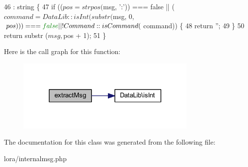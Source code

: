 \begin{DoxyCode}
46                                                     : \textcolor{keywordtype}{string} \{
47         \textcolor{keywordflow}{if} (($pos = strpos ($msg, \textcolor{charliteral}{':'})) === \textcolor{keyword}{false} || ($command = DataLib::isInt (substr ($msg, 0, $pos))) 
      === \textcolor{keyword}{false} || !Command::isCommand ($command)) \{
48             \textcolor{keywordflow}{return} \textcolor{stringliteral}{''};
49         \}
50         \textcolor{keywordflow}{return} substr ($msg, $pos + 1);
51     \}
\end{DoxyCode}
Here is the call graph for this function\+:
\nopagebreak
\begin{figure}[H]
\begin{center}
\leavevmode
\includegraphics[width=252pt]{class_internal_m_s_g_a747d0ca9fce2e083cbb6c9701fcaa795_cgraph}
\end{center}
\end{figure}


The documentation for this class was generated from the following file\+:\begin{DoxyCompactItemize}
\item 
lora/internalmsg.\+php\end{DoxyCompactItemize}
